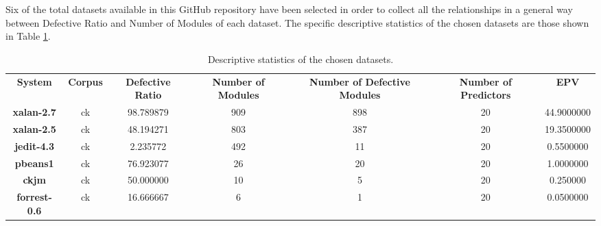 Six of the total datasets available in this GitHub repository have been selected in order to collect all the relationships in a general way between Defective Ratio and Number of Modules of each dataset. The specific descriptive statistics of the chosen datasets are those shown in Table \ref{tab:descriptive-statistics}.

\begin{table}[H]
\centering
    \begin{tabular}{|c|c|c|c|c|c|c|}
        \hline
        \multirow{3}{*}{\textbf{System}} & \multirow{3}{*}{\textbf{Corpus}} & \multirow{3}{2cm}{\textbf{Defective Ratio}} & \multirow{3}{2cm}{\textbf{Number of Modules}} & \multirow{3}{2cm}{\textbf{Number of Defective Modules}} & \multirow{3}{2cm}{\textbf{Number of Predictors}} & \multirow{3}{*}{\textbf{EPV}} \\
         & & & & & & \\
         & & & & & & \\ \hline
        \textbf{xalan-2.7} & ck & 98.789879 & 909 & 898 & 20 & 44.9000000 \\ \hline
        \textbf{xalan-2.5} & ck & 48.194271 & 803 & 387 & 20 & 19.3500000 \\ \hline
        \textbf{jedit-4.3} & ck & 2.235772 & 492 & 11 & 20 & 0.5500000 \\ \hline
        \textbf{pbeans1} & ck & 76.923077 & 26 & 20 & 20 & 1.0000000 \\ \hline
        \textbf{ckjm} & ck & 50.000000 & 10 & 5 & 20 & 0.250000 \\ \hline
        \textbf{forrest-0.6} & ck & 16.666667 & 6 & 1 & 20 & 0.0500000 \\ \hline
    \end{tabular}
\caption{Descriptive statistics of the chosen datasets.}
\label{tab:descriptive-statistics}
\end{table}

